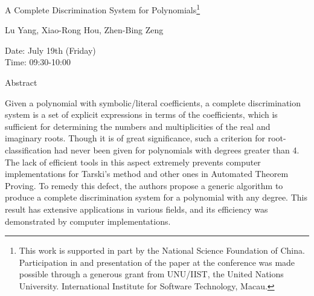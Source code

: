\begin{center}
\LARGE
A Complete Discrimination System for Polynomials\footnote{
   This work is supported in part by the National Science Foundation of China.
   Participation in and presentation of the paper at the conference was
   made possible through a generous grant from UNU/IIST, the United Nations
   University. International Institute for Software Technology, Macau.}
\end{center}

\begin{center}
\Large
Lu Yang, Xiao-Rong Hou, Zhen-Bing Zeng

\end{center}

\noindent
Date:  July 19th (Friday)\\
Time: 09:30-10:00\\

\begin{center}
\large
Abstract
\end{center}

Given a polynomial with symbolic/literal coefficients, a complete discrimination system is a set of
explicit expressions in terms of the coefficients, which is sufficient for determining the numbers
and multiplicities of the real and imaginary roots. Though it is of great significance, such a
criterion for root-classification had never been given for polynomials with degrees greater than 4.
The lack of efficient tools in this aspect extremely prevents computer implementations for
Tarski's method and other ones in Automated Theorem Proving. To remedy this defect, the authors
propose a generic algorithm to produce a complete discrimination system for a polynomial with
any degree. This result has extensive applications in various fields, and its efficiency was
demonstrated by computer implementations. 

